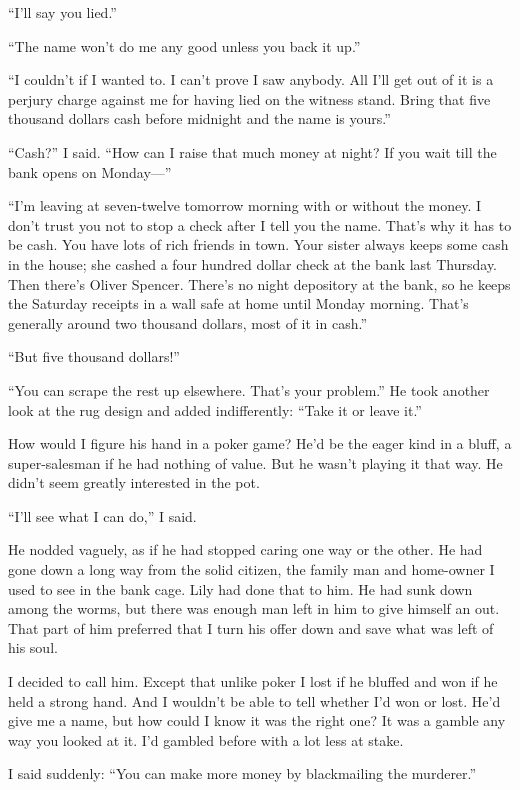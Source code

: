 \documentclass{novel}
\begin{document}
{“I’ll say you lied.”

“The name won’t do me any good unless you back it up.”

“I couldn’t if I wanted to. I can’t prove I saw anybody. All I’ll get out of it is a perjury charge against me for having lied on the witness stand. Bring that five thousand dollars cash before midnight and the name is yours.”

“Cash?” I said. “How can I raise that much money at night? If you wait till the bank opens on Monday—”

“I’m leaving at seven-twelve tomorrow morning with or without the money. I don’t trust you not to stop a check after I tell you the name. That’s why it has to be cash. You have lots of rich friends in town. Your sister always keeps some cash in the house; she cashed a four hundred dollar check at the bank last Thursday. Then there’s Oliver Spencer. There’s no night depository at the bank, so he keeps the Saturday receipts in a wall safe at home until Monday morning. That’s generally around two thousand dollars, most of it in cash.”

“But five thousand dollars!”

“You can scrape the rest up elsewhere. That’s your problem.” He took another look at the rug design and added indifferently: “Take it or leave it.”

How would I figure his hand in a poker game? He’d be the eager kind in a bluff, a super-salesman if he had nothing of value. But he wasn’t playing it that way. He didn’t seem greatly interested in the pot.

“I’ll see what I can do,” I said.

He nodded vaguely, as if he had stopped caring one way or the other. He had gone down a long way from the solid citizen, the family man and home-owner I used to see in the bank cage. Lily had done that to him. He had sunk down among the worms, but there was enough man left in him to give himself an out. That part of him preferred that I turn his offer down and save what was left of his soul.

I decided to call him. Except that unlike poker I lost if he bluffed and won if he held a strong hand. And I wouldn’t be able to tell whether I’d won or lost. He’d give me a name, but how could I know it was the right one? It was a gamble any way you looked at it. I’d gambled before with a lot less at stake.

I said suddenly: “You can make more money by blackmailing the murderer.”

}
\end{document}
